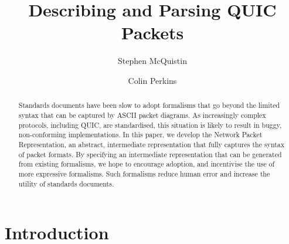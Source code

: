 \documentclass[10pt,sigconf]{acmart}
\begin{document}
\title{Describing and Parsing QUIC Packets}

\author{Stephen McQuistin}
\orcid{}

\author{Colin Perkins}

\begin{abstract}


Standards documents have been slow to adopt formalisms that go beyond the limited syntax
that can be captured by ASCII packet diagrams. As increasingly complex protocols,
including QUIC, are standardised, this situation is likely to result in buggy,
non-conforming implementations. In this paper, we develop the Network Packet Representation,
an abstract, intermediate representation that fully captures the syntax of
packet formats. By specifying an intermediate representation that can be generated from
existing formalisms, we hope to encourage adoption, and incentivise the use of more
expressive formalisms. Such formalisms reduce human error and increase the utility of standards documents.

\end{abstract}
\maketitle
\section{Introduction}

%
\end{document}
